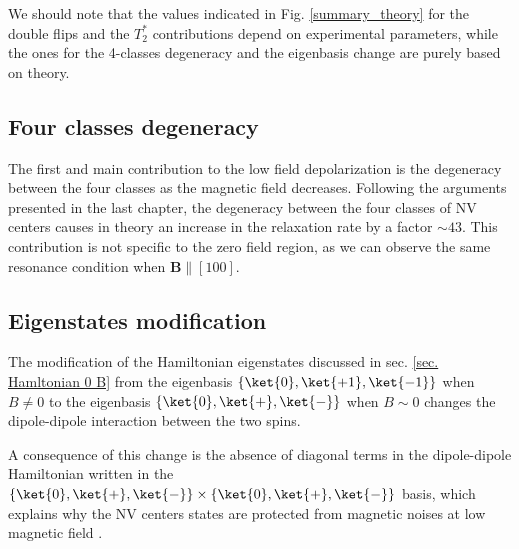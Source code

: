 \documentclass[a4paper, 11pt]{book}
\begin{document}
We should note that the values indicated in Fig. \ref{summary_theory} for the double flips and the $T_2^*$ contributions depend on experimental parameters, while the ones for the 4-classes degeneracy and the eigenbasis change are purely based on theory.

\subsection{Four classes degeneracy}

The first and main contribution to the low field depolarization is the degeneracy between the four classes as the magnetic field decreases. Following the arguments presented in the last chapter, the degeneracy between the four classes of NV centers causes in theory an increase in the relaxation rate by a factor $\sim 43$. This contribution is not specific to the zero field region, as we can observe the same resonance condition when $\mathbf{B} \parallel [100]$.


\subsection{Eigenstates modification}

The modification of the Hamiltonian eigenstates discussed in sec. \ref{sec. Hamltonian 0 B} from the eigenbasis $\{ \ket{0}, \ket{+1},\ket{-1} \}$ when $B\neq 0$ to the eigenbasis $\{ \ket{0}, \ket{+},\ket{-} \}$ when $B\sim 0$ changes the dipole-dipole interaction between the two spins. 

A consequence of this change is the absence of diagonal terms  in the dipole-dipole Hamiltonian written in the $\{ \ket{0}, \ket{+},\ket{-} \} \times \{ \ket{0}, \ket{+},\ket{-} \}$ basis, which explains why the NV centers states are protected from magnetic noises at low magnetic field \citep{jamonneau2016competition}. 
\end{document}
